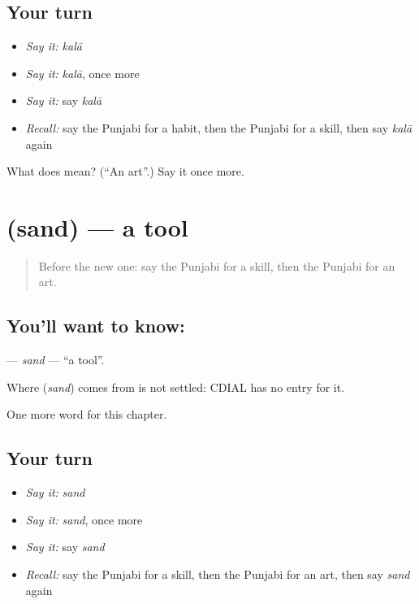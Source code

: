 \subsection*{Your turn}
\begin{itemize}
\raggedright
  \item \emph{Say it:} \emph{kalā}
  \item \emph{Say it:} \emph{kalā}, once more
  \item \emph{Say it:} say \emph{kalā}
  \item \emph{Recall:} say the Punjabi for a habit, then the Punjabi for a skill, then say \emph{kalā} again
\end{itemize}

\begin{tcolorbox}[breakable,colback=teal!4,colframe=teal!35!black,title={Before you move on}]
What does  mean? (\textquotedblleft{}An art\textquotedblright{}.) Say it once more.
\end{tcolorbox}
\section[\texorpdfstring{\pa{ਸੰਦ} (sand)}{ਸੰਦ (sand)}]{ (sand) — a tool}

\label{lesson:PA-C112-sand}



\begin{quote}
Before the new one: say the Punjabi for a skill, then the Punjabi for an art.
\end{quote}

\subsection*{You'll want to know: }
\textbf{} — \emph{sand} — \textquotedblleft{}a tool\textquotedblright{}.

\begin{cousinweb}
Where \textbf{} (\emph{sand}) comes from is not settled: CDIAL has no entry for it.
\end{cousinweb}

\begin{grammarlens}[title={What you've built}]
One more word for this chapter.
\end{grammarlens}

\subsection*{Your turn}
\begin{itemize}
\raggedright
  \item \emph{Say it:} \emph{sand}
  \item \emph{Say it:} \emph{sand}, once more
  \item \emph{Say it:} say \emph{sand}
  \item \emph{Recall:} say the Punjabi for a skill, then the Punjabi for an art, then say \emph{sand} again
\end{itemize}

